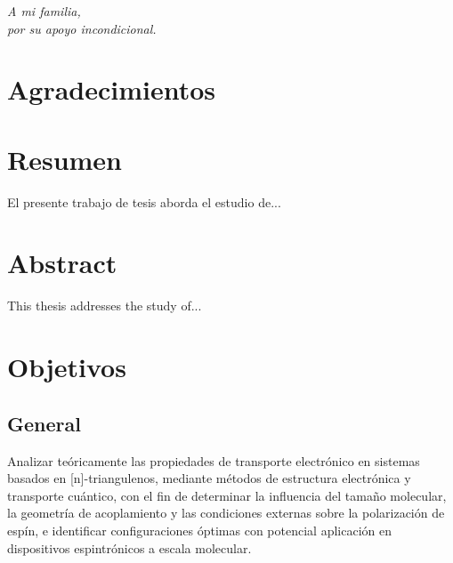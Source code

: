 \documentclass{book}
\begin{document}
\clearpage
\thispagestyle{empty}

\vspace*{5cm}
\begin{flushright}
\textit{A mi familia, \\ por su apoyo incondicional.}
\end{flushright}

\chapter*{Agradecimientos}
\clearpage
\thispagestyle{empty}

\chapter*{Resumen}
El presente trabajo de tesis aborda el estudio de...
\clearpage
\thispagestyle{empty}

\chapter*{Abstract}
This thesis addresses the study of...
\clearpage
\thispagestyle{empty}

\tableofcontents
\newpage
\clearpage
\thispagestyle{empty}

\mainmatter
\chapter*{Objetivos}
    \section*{General}
Analizar teóricamente las propiedades de transporte electrónico en sistemas basados en [n]-triangulenos, mediante métodos de estructura electrónica y transporte cuántico, con el fin de determinar la influencia del tamaño molecular, la geometría de acoplamiento y las condiciones externas sobre la polarización de espín, e identificar configuraciones óptimas con potencial aplicación en dispositivos espintrónicos a escala molecular.
\end{document}
